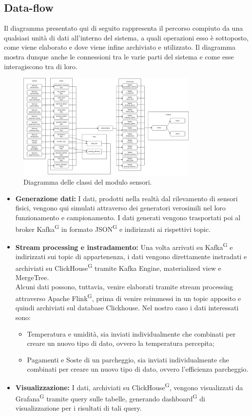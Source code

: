 \documentclass[8pt]{article}
\newcommand{\glossterm}[1]{#1\textsuperscript{G}} %
\begin{document}
\subsection{Data-flow}
Il diagramma presentato qui di seguito rappresenta il percorso compiuto da una qualsiasi unità di dati all'interno del sistema, a quali operazioni esso è sottoposto, come viene elaborato e dove viene infine archiviato e utilizzato. Il diagramma mostra dunque anche le connessioni tra le varie parti del sistema e come esse interagiscono tra di loro.
\begin{figure}[h!]
    \centering
    \includegraphics[width=0.8\textwidth]{images_st/flusso.png}
    \caption{Diagramma delle classi del modulo sensori.}
    \label{fig:Diagramma delle classi del modulo sensori}
\end{figure}
\begin{itemize}
    \item \textbf{Generazione dati:} I dati, prodotti nella realtà dal rilevamento di sensori fisici, vengono qui simulati attraverso dei generatori verosimili nel loro funzionamento e campionamento. I dati generati vengono trasportati poi al broker \glossterm{Kafka} in formato \glossterm{JSON} e indirizzati ai rispettivi topic.
    \item \textbf{Stream processing e instradamento:} Una volta arrivati su \glossterm{Kafka} e indirizzati sui topic di appartenenza, i dati vengono direttamente instradati e archiviati su \glossterm{ClickHouse} tramite Kafka Engine, materialized view e MergeTree. \\
    Alcuni dati possono, tuttavia, venire elaborati tramite stream processing attraverso Apache \glossterm{Flink}, prima di venire reimmessi in un topic apposito e quindi archiviati sul database Clickhouse. Nel nostro caso i dati interessati sono: 
    \begin{itemize}
    	\item Temperatura e umidità, sia inviati individualmente che combinati per creare un nuovo tipo di dato, ovvero la temperatura percepita;
    	\item Pagamenti e Soste di un parcheggio, sia inviati individualmente che combinati per creare un nuovo tipo di dato, ovvero l'efficienza parcheggio.
    \end{itemize}
    \item \textbf{Visualizzazione:} I dati, archiviati su \glossterm{ClickHouse}, vengono visualizzati da \glossterm{Grafana} tramite query sulle tabelle, generando \glossterm{dashboard} di visualizzazione per i risultati di tali query.
\end{itemize}
\clearpage
\end{document}
